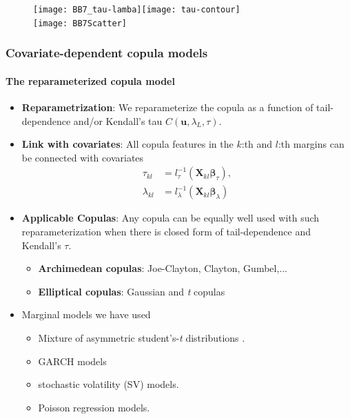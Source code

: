 \documentclass[10pt,aspectratio=43]{beamer}
\begin{document}
\begin{frame}[plain]
  \begin{figure}
    \centering
    \vspace{-0.35cm}
    \texttt{[image: BB7\_tau-lamba]}\texttt{[image: tau-contour]}\\
    \texttt{[image: BB7Scatter]}
  \end{figure}
\end{frame}


\begin{frame}
  \frametitle{Covariate-dependent copula models}
  \framesubtitle{The reparameterized copula model}
  \begin{itemize}


  \item \textbf{Reparametrization}: We reparameterize the copula as a function of
    tail-dependence and/or Kendall's tau $C(\bm{u},\lambda_L,\tau)$.

  \item \textbf{Link with covariates}: All copula features in the $k$:th and $l$:th margins can be connected with
    covariates
      \begin{align*}
        \tau_{kl}&=l_{\tau}^{-1}(\bm{X}_{kl}\bm{\beta}_{\tau}),\\
        \lambda_{kl}&=l_{\lambda}^{-1}(\bm{X}_{kl}\bm{\beta}_{\lambda})
      \end{align*}

    \item \textbf{Applicable Copulas}: Any copula can be equally well used with such
      reparameterization when there is closed form of tail-dependence and Kendall's
      $\tau$.

    \begin{itemize}
    \item \textbf{Archimedean copulas}: Joe-Clayton, Clayton, Gumbel,...
    \item \textbf{Elliptical copulas}: Gaussian and \emph{t} copulas
    \end{itemize}

  \item Marginal models we have used

    \begin{itemize}
    \item Mixture of asymmetric student's-\emph{t} distributions \citep{li2010flexible}.
    \item GARCH models
    \item stochastic volatility (SV) models.
    \item Poisson regression models.
    \end{itemize}

  \end{itemize}
\end{frame}
\end{document}
